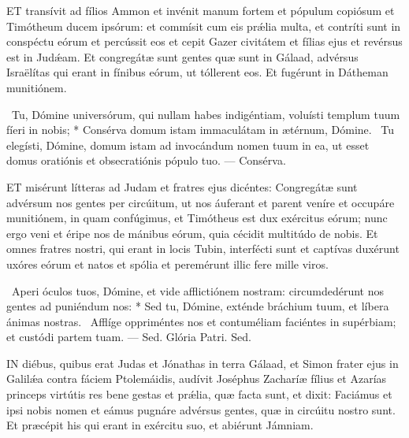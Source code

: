 
\lettrine[lines=2]{E}{T} transívit ad fílios Ammon et invénit manum fortem et pópulum copiósum et Timótheum ducem ipsórum: et commísit cum eis prǽlia multa, et contríti sunt in conspéctu eórum et percússit eos et cepit Gazer civitátem et fílias ejus et revérsus est in Judǽam. Et congregátæ sunt gentes quæ sunt in Gálaad, advérsus Israëlítas qui erant in fínibus eórum, ut tóllerent eos. Et fugérunt in Dátheman munitiónem.

\R\ Tu, Dómine universórum, qui nullam habes indigéntiam, voluísti templum tuum fíeri in nobis; * Consérva domum istam immaculátam in ætérnum, Dómine. \V\ Tu elegísti, Dómine, domum istam ad invocándum nomen tuum in ea, ut esset domus oratiónis et obsecratiónis pópulo tuo. — Consérva.



\lettrine[lines=2]{E}{T} misérunt lítteras ad Judam et fratres ejus dicéntes: Congregátæ sunt advérsum nos gentes per circúitum, ut nos áuferant et parent veníre et occupáre munitiónem, in quam confúgimus, et Timótheus est dux exércitus eórum; nunc ergo veni et éripe nos de mánibus eórum, quia cécidit multitúdo de nobis. Et omnes fratres nostri, qui erant in locis Tubin, interfécti sunt et captívas duxérunt uxóres eórum et natos et spólia et peremérunt illic fere mille viros.

\R\ Aperi óculos tuos, Dómine, et vide afflictiónem nostram: circumdedérunt nos gentes ad puniéndum nos: * Sed tu, Dómine, exténde bráchium tuum, et líbera ánimas nostras. \V\ Afflíge oppriméntes nos et contuméliam faciéntes in supérbiam; et custódi partem tuam. — Sed. Glória Patri. Sed.




\lettrine[lines=2]{I}{N} diébus, quibus erat Judas et Jónathas in terra Gálaad, et Simon frater ejus in Galilǽa contra fáciem Ptolemáidis, audívit Joséphus Zacharíæ fílius et Azarías princeps virtútis res bene gestas et prǽlia, quæ facta sunt, et dixit: Faciámus et ipsi nobis nomen et eámus pugnáre advérsus gentes, quæ in circúitu nostro sunt. Et præcépit his qui erant in exércitu suo, et abiérunt Jámniam.

